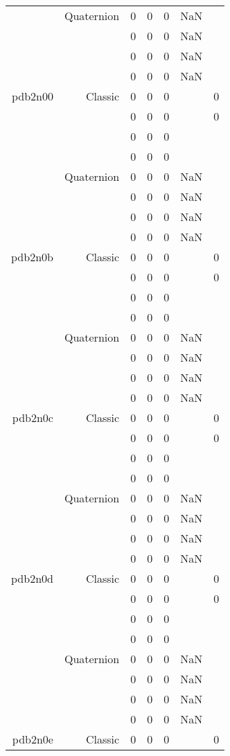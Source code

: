 \begin{xltabular}{\textwidth}{r|rcccSc}
& Quaternion & 0 & 0 & 0 & NaN & \\
& & 0 & 0 & 0 & NaN & \\
& & 0 & 0 & 0 & NaN & \\
& & 0 & 0 & 0 & NaN & \\ \addlinespace
pdb2n00 & Classic & 0 & 0 & 0 & & 0 \\
& & 0 & 0 & 0 & & 0 \\
& & 0 & 0 & 0 & & \\
& & 0 & 0 & 0 & & \\
& Quaternion & 0 & 0 & 0 & NaN & \\
& & 0 & 0 & 0 & NaN & \\
& & 0 & 0 & 0 & NaN & \\
& & 0 & 0 & 0 & NaN & \\ \addlinespace
pdb2n0b & Classic & 0 & 0 & 0 & & 0 \\
& & 0 & 0 & 0 & & 0 \\
& & 0 & 0 & 0 & & \\
& & 0 & 0 & 0 & & \\
& Quaternion & 0 & 0 & 0 & NaN & \\
& & 0 & 0 & 0 & NaN & \\
& & 0 & 0 & 0 & NaN & \\
& & 0 & 0 & 0 & NaN & \\ \addlinespace
pdb2n0c & Classic & 0 & 0 & 0 & & 0 \\
& & 0 & 0 & 0 & & 0 \\
& & 0 & 0 & 0 & & \\
& & 0 & 0 & 0 & & \\
& Quaternion & 0 & 0 & 0 & NaN & \\
& & 0 & 0 & 0 & NaN & \\
& & 0 & 0 & 0 & NaN & \\
& & 0 & 0 & 0 & NaN & \\ \addlinespace
pdb2n0d & Classic & 0 & 0 & 0 & & 0 \\
& & 0 & 0 & 0 & & 0 \\
& & 0 & 0 & 0 & & \\
& & 0 & 0 & 0 & & \\
& Quaternion & 0 & 0 & 0 & NaN & \\
& & 0 & 0 & 0 & NaN & \\
& & 0 & 0 & 0 & NaN & \\
& & 0 & 0 & 0 & NaN & \\ \addlinespace
pdb2n0e & Classic & 0 & 0 & 0 & & 0 \\

\end{xltabular}
